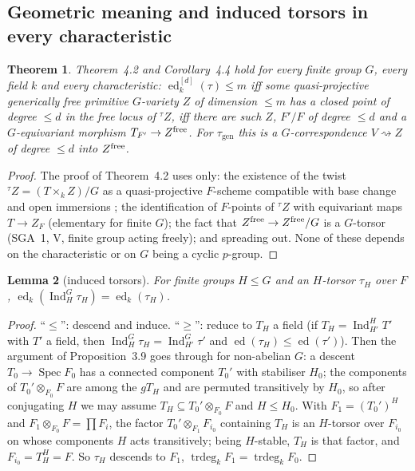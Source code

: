 \documentclass[11pt]{amsart}
\newtheorem{theorem}{Theorem}[section]
\newtheorem{lemma}[theorem]{Lemma}
\theoremstyle{definition}
\theoremstyle{remark}
\newcommand{\ed}{\operatorname{ed}}
\newcommand{\edd}[1]{\ed^{[#1]}}
\newcommand{\tr}{\operatorname{trdeg}}
\newcommand{\Ind}{\operatorname{Ind}}
\newcommand{\gen}{\mathrm{gen}}
\newcommand{\stag}[1]{\hfill{\normalfont[#1]}}
\begin{document}
\subsection{Geometric meaning and induced torsors in every characteristic}

\begin{theorem}\label{thm:geom}
Theorem~4.2 and Corollary~4.4 hold for every finite group $G$, every field $k$ and
every characteristic: $\edd d_k(\tau)\le m$ iff some quasi-projective generically free
primitive $G$-variety $Z$ of dimension $\le m$ has a closed point of degree $\le d$ in
the free locus of ${}^\tau Z$, iff there are such $Z$, $F'/F$ of degree $\le d$ and a
$G$-equivariant morphism $T_{F'}\to Z^{\rm free}$. For $\tau_\gen$ this is a
$G$-correspondence $V\rightsquigarrow Z$ of degree $\le d$ into $Z^{\rm free}$.
\stag{proved}
\end{theorem}

\begin{proof}
The proof of Theorem~4.2 uses only: the existence of the twist ${}^\tau Z=(T\times_kZ)/G$
as a quasi-projective $F$-scheme compatible with base change and open immersions
\cite[\S3]{DR}; the identification of $F$-points of ${}^\tau Z$ with equivariant maps
$T\to Z_F$ (elementary for finite $G$); the fact that $Z^{\rm free}\to Z^{\rm free}/G$
is a $G$-torsor (SGA~1, V, finite group acting freely); and spreading out. None of
these depends on the characteristic or on $G$ being a cyclic $p$-group.
\end{proof}

\begin{lemma}[induced torsors]\label{lem:ind}
For finite groups $H\le G$ and an $H$-torsor $\tau_H$ over $F$,
$\ed_k(\Ind_H^G\tau_H)=\ed_k(\tau_H)$.
\stag{proved}
\end{lemma}

\begin{proof}
``$\le$'': descend and induce. ``$\ge$'': reduce to $T_H$ a field (if
$T_H=\Ind_{H'}^HT'$ with $T'$ a field, then $\Ind_H^G\tau_H=\Ind_{H'}^G\tau'$ and
$\ed(\tau_H)\le\ed(\tau')$). Then the argument of Proposition~3.9 goes through for
non-abelian $G$: a descent $T_0\to\operatorname{Spec}F_0$ has a connected component
$T_0'$ with stabiliser $H_0$; the components of $T_0'\otimes_{F_0}F$ are among the
$gT_H$ and are permuted transitively by $H_0$, so after conjugating $H$ we may assume
$T_H\subseteq T_0'\otimes_{F_0}F$ and $H\le H_0$. With $F_1=(T_0')^H$ and
$F_1\otimes_{F_0}F=\prod F_i$, the factor $T_0'\otimes_{F_1}F_{i_0}$ containing $T_H$
is an $H$-torsor over $F_{i_0}$ on whose components $H$ acts transitively; being
$H$-stable, $T_H$ is that factor, and $F_{i_0}=T_H^H=F$. So $\tau_H$ descends to
$F_1$, $\tr_kF_1=\tr_kF_0$.
\end{proof}
\end{document}
